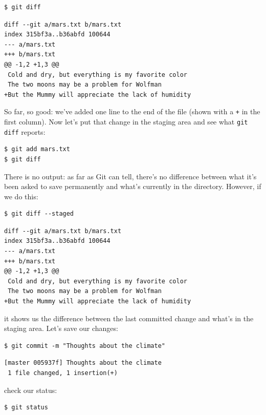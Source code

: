 \documentclass{book}
\begin{document}
\begin{verbatim}
$ git diff
\end{verbatim}

\begin{verbatim}
diff --git a/mars.txt b/mars.txt
index 315bf3a..b36abfd 100644
--- a/mars.txt
+++ b/mars.txt
@@ -1,2 +1,3 @@
 Cold and dry, but everything is my favorite color
 The two moons may be a problem for Wolfman
+But the Mummy will appreciate the lack of humidity
\end{verbatim}

So far, so good: we've added one line to the end of the file (shown with
a \texttt{+} in the first column). Now let's put that change in the
staging area and see what \texttt{git diff} reports:

\begin{verbatim}
$ git add mars.txt
$ git diff
\end{verbatim}

There is no output: as far as Git can tell, there's no difference
between what it's been asked to save permanently and what's currently in
the directory. However, if we do this:

\begin{verbatim}
$ git diff --staged
\end{verbatim}

\begin{verbatim}
diff --git a/mars.txt b/mars.txt
index 315bf3a..b36abfd 100644
--- a/mars.txt
+++ b/mars.txt
@@ -1,2 +1,3 @@
 Cold and dry, but everything is my favorite color
 The two moons may be a problem for Wolfman
+But the Mummy will appreciate the lack of humidity
\end{verbatim}

it shows us the difference between the last committed change and what's
in the staging area. Let's save our changes:

\begin{verbatim}
$ git commit -m "Thoughts about the climate"
\end{verbatim}

\begin{verbatim}
[master 005937f] Thoughts about the climate
 1 file changed, 1 insertion(+)
\end{verbatim}

check our status:

\begin{verbatim}
$ git status
\end{verbatim}
\end{document}
